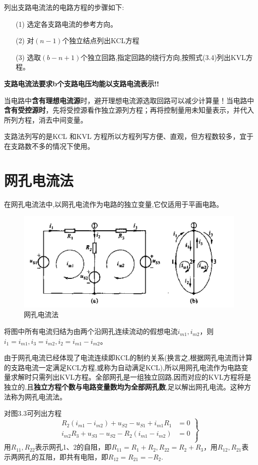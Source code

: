 \documentclass[11pt,a4paper,oneside]{book}
\begin{document}
列出支路电流法的电路方程的步骤如下:
\begin{enumerate}\setlength{\itemsep}{0.2pt}
	\item[(1)]选定各支路电流的参考方向。
	\item[(2)]对$(n-1)$个独立结点列出KCL方程
	\item[(3)]选取$(b-n+1)$个独立回路,指定回路的绕行方向,按照式(3.4)列出KVL方程。
\end{enumerate}

\textbf{支路电流法要求b个支路电压均能以支路电流表示!!}

当电路中\textbf{含有理想电流源}时，避开理想电流源选取回路可以减少计算量！当电路中\textbf{含有受控源时}，先将受控源看作独立源列方程；再将控制量用未知量表示，并代入所列方程，消去中间变量。

支路法列写的是KCL 和KVL 方程所以方程列写方便、直观，但方程数较多，宜于在支路数不多的情况下使用。
\section{网孔电流法}
在网孔电流法中,以网孔电流作为电路的独立变量,它仅适用于平画电路。
\begin{figure}[H]
	\centering
	\includegraphics[width=0.7\linewidth]{screenshot038}
	\caption{网孔电流法}
	\label{fig:screenshot038}
\end{figure}
将图中所有电流归结为由两个沿网孔连续流动的假想电流$i_{m1},i_{m2}$，则$i_1=i_{m1},i_3=i_{m2},i_2=i_{m1}-i_{m2}$。

由于网孔电流已经体现了电流连续即KCL的制约关系(换言之,根据网孔电流而计算的支路电流一定满足KCL方程,或称为自动满足KCL),所以用网孔电流作为电路变量求解时只需列出KVL方程。全部网孔是一组独立回路,因而对应的KVL方程将是独立的,且\textbf{独立方程个数与电路变量数均为全部网孔数},足以解出网孔电流。这种方法称为网孔电流法。

对图3.3可列出方程
\begin{equation}
	\left.
	\begin{aligned}
		R_2(i_{m1}-i_{m2})+u_{S2}-u_{S1}+i_{m1}R_1&=0 \\
		i_{m2}R_3+u_{S3}-u_{S2}-R_2(i_{m1}-i_{m2})&=0\\
	\end{aligned}
	\right\}
\end{equation}
用$R_{11},R_{22}$表示网孔1、2的自阻，即$R_{11}=R_1+R_2,R_{22}=R_2+R_3$，用$R_{12},R_{21}$表示两网孔的互阻，即共有电阻，即$R_{12}=R_{21}=-R_2$.
\end{document}
